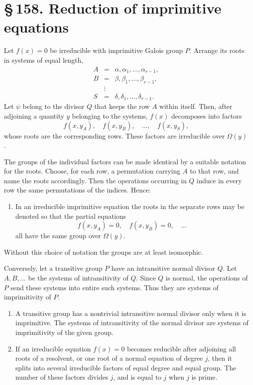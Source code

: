 \documentclass[11pt]{article}
\providecommand{\sect}[2]{\section*{\S\,#1. #2}}
\begin{document}
\sect{158}{Reduction of imprimitive equations}

Let $f(x)=0$ be irreducible with imprimitive Galois group $P$. Arrange its roots in systems of equal length,
\[
\begin{array}{lll}
        A&=&\alpha,
\alpha_1,
\ldots,
\alpha_{r-1},\\
        B&=&\beta,
\beta_1,
\ldots,
\beta_{r-1},\\
        &\vdots&\\
        S&=&\delta,
\delta_1,
\ldots,
\delta_{r-1}.
\end{array}
\]
Let $\psi$ belong to the divisor $Q$ that keeps the row $A$ within itself. Then, after adjoining a quantity $y$ belonging to the systems, $f(x)$ decomposes into factors
\[
        f(x,y_A),
\quad f(x,y_B),
\quad \ldots,
\quad f(x,y_S),
\]
whose roots are the corresponding rows. These factors are irreducible over $\Omega(y)$.

The groups of the individual factors can be made identical by a suitable notation for the roots. Choose, for each row, a permutation carrying $A$ to that row, and name the roots accordingly. Then the operations occurring in $Q$ induce in every row the same permutations of the indices. Hence:
\begin{enumerate}[label=\arabic*.,leftmargin=2em]
\item In an irreducible imprimitive equation the roots in the separate rows may be denoted so that the partial equations
\[
        f(x,y_A)=0,
\quad f(x,y_B)=0,
\quad \ldots
\]
all have the same group over $\Omega(y)$.
\end{enumerate}
Without this choice of notation the groups are at least isomorphic.

Conversely, let a transitive group $P$ have an intransitive normal divisor $Q$. Let $A,B,
\ldots$ be the systems of intransitivity of $Q$. Since $Q$ is normal, the operations of $P$ send these systems into entire such systems. Thus they are systems of imprimitivity of $P$.

\begin{enumerate}[label=\arabic*.,leftmargin=2em,start=2]
\item A transitive group has a nontrivial intransitive normal divisor only when it is imprimitive. The systems of intransitivity of the normal divisor are systems of imprimitivity of the given group.
\item If an irreducible equation $f(x)=0$ becomes reducible after adjoining all roots of a resolvent, or one root of a normal equation of degree $j$, then it splits into several irreducible factors of equal degree and equal group. The number of these factors divides $j$, and is equal to $j$ when $j$ is prime.
\end{enumerate}
\end{document}
